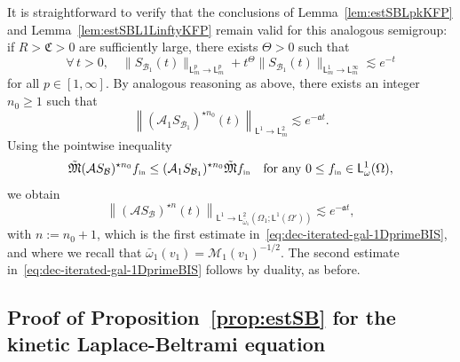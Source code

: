 \documentclass[11pt]{amsart}
\theoremstyle{definition}
\theoremstyle{remark}
\numberwithin{equation}{section}
\def\AA{{\mathcal A}}
\def\BB{{\mathcal B}}
\def\MMM{{\mathscr M}}
\def\fM{{\mathfrak M}}
\newcommand{\init}{\text{{\tiny {\rm in}}}}
\newcommand{\sfL}{\mathsf{L}}
\begin{document}
It is straightforward to verify that the conclusions of Lemma~\ref{lem:estSBLpkKFP} and Lemma~\ref{lem:estSBL1LinftyKFP} remain valid for this analogous semigroup: if $R > \mathfrak{C} > 0$ are sufficiently large, there exists $\Theta > 0$ such that
\begin{equation*}
  \forall \, t > 0, \quad \| S_{\BB_1} (t) \|_{\sfL^{p}_{m} \to \sfL^{p}_{m}}  +  t^\Theta \| S_{\BB_1} (t) \|_{{\sfL^{1}_{m}  \to \sfL^{\infty}_{m}}}  \lesssim e^{-t}
\end{equation*}
for all $p \in [1,\infty]$. By analogous reasoning as above, there exists an integer $n_0 \ge 1$ such that
\begin{equation*}
  \left\| (\AA_1 S_{\mathcal B_1})^{\star n_0}(t) \right\|_{\sfL^{1} \to \sfL^{2}_{m}} \lesssim e^{- \mathfrak{a} t}.
\end{equation*}
Using the pointwise inequality
\begin{equation*}
  \tilde \fM (\AA S_{\mathcal B})^{\star n_0} f_\init \le (\AA_1 S_{\mathcal B_1})^{\star n_0} \tilde \fM f_\init \quad \text{for any } 0 \le f_\init \in \sfL^1_\omega(\Omega),
\end{equation*}
we obtain
\begin{equation*}
  \left\| (\AA S_{\mathcal B})^{\star n}(t) \right\|_{\sfL^{1} \to \sfL^{2}_{\bar \omega_1}(\Omega_1 ; \sfL^{1}(\Omega'))} \lesssim e^{- \mathfrak{a} t},
\end{equation*}
with $n := n_0+1$, which is the first estimate in~\eqref{eq:dec-iterated-gal-1DprimeBIS}, and where we recall that $\bar \omega_1(v_1) = \MMM_1(v_1)^{-1/2}$. The second estimate in~\eqref{eq:dec-iterated-gal-1DprimeBIS} follows by duality, as before.

\subsection{Proof of Proposition~\ref{prop:estSB} for the kinetic Laplace-Beltrami equation}
\label{subsec-split-LB}
\end{document}
